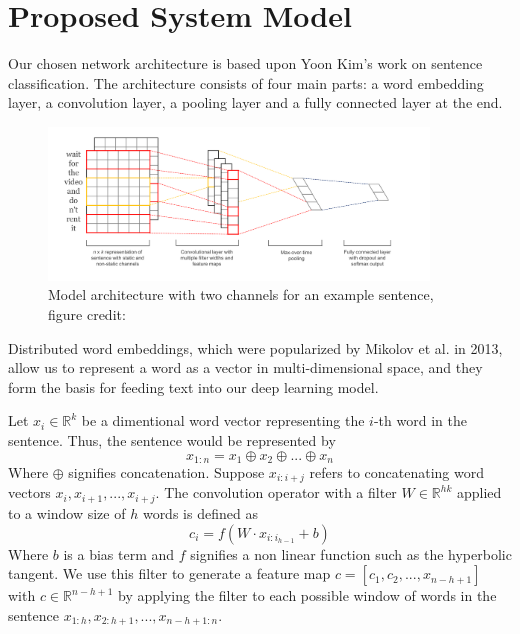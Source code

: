 \documentclass[conference]{IEEEtran}
\begin{document}
\section{Proposed System Model}
     Our chosen network architecture is based upon Yoon Kim's work on sentence
     classification\cite{kim2014convolutional}. The architecture consists of four main parts: a word
     embedding layer, a convolution layer, a pooling layer and a fully connected layer
     at the end.
    \begin{figure}
    \center\includegraphics[width=0.9\textwidth]{figure/sc_model}
    \caption{Model architecture with two channels for an example sentence,
        figure credit: \cite{kim2014convolutional}}
    \end{figure}

     Distributed word embeddings, which were popularized by Mikolov et al.
     in 2013\cite{word2vec}, allow us to represent a word as a vector in
     multi-dimensional space, and they form the basis for feeding text into our deep
     learning model.

     Let $x_{i} \in \mathbb{R}^k$ be a dimentional word vector representing the $i$-th word in the
     sentence. Thus, the sentence would be represented by
     \begin{equation}
      x_{1:n} = x_1 \oplus x_2 \oplus ... \oplus x_n
      \end{equation}
      Where $\oplus$ signifies concatenation. Suppose $x_{i:i+j}$ refers to concatenating
      word vectors $x_i, x_{i+1}, ... , x_{i+j}$. The convolution operator with a filter
       $W \in \mathbb{R}^{hk}$ applied to a window size of $h$
      words is defined as
      \begin{equation}
      c_i = f(W \cdot x_{i:i_{h-1}} + b)
      \end{equation}
      Where $b$ is a bias term and $f$ signifies a non linear function such as the hyperbolic
      tangent. We use this filter to generate a feature map $c = [c_1, c_2, ... ,x_{n-h+1}]$
      with $c \in \mathbb{R}^{n-h+1}$ by applying the filter to each possible window of words in
      the sentence $x_{1:h}, x_{2:h+1}, ... ,x_{n-h+1:n}$.
\end{document}
